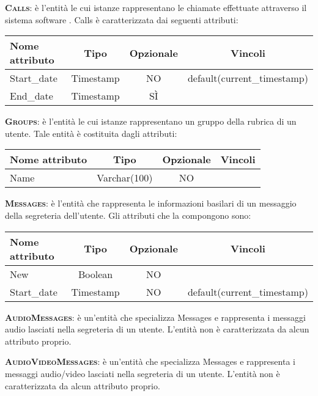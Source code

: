 \begin{description}
	\item{\scshape\bfseries Calls}: è l'entità le cui istanze rappresentano le chiamate effettuate attraverso il sistema software \caName. Calls è caratterizzata dai seguenti attributi:

\begin{center}
\begin{tabular}{lccc}
\toprule
Nome attributo & Tipo & Opzionale & Vincoli\\
\midrule
Start\_date & Timestamp & NO & default(current\_timestamp)\\
End\_date & Timestamp & SÌ & \\
\bottomrule
\end{tabular}
\end{center}

	\item{\scshape\bfseries Groups}: è l'entità le cui istanze rappresentano un gruppo della rubrica di un utente. Tale entità è costituita dagli attributi:

\begin{center}
\begin{tabular}{lccc}
\toprule
Nome attributo & Tipo & Opzionale & Vincoli\\
\midrule
Name & Varchar(100) & NO &\\
\bottomrule
\end{tabular}
\end{center}	
	
	\item{\scshape\bfseries Messages}: è l'entità che rappresenta le informazioni basilari di un messaggio della segreteria dell'utente. Gli attributi che la compongono sono:

\begin{center}
\begin{tabular}{lccc}
\toprule
Nome attributo & Tipo & Opzionale & Vincoli\\
\midrule
New & Boolean & NO & \\
Start\_date & Timestamp & NO & default(current\_timestamp) \\
\bottomrule
\end{tabular}
\end{center}	
	
	\item{\scshape\bfseries AudioMessages}: è un'entità che specializza Messages e rappresenta i messaggi audio lasciati nella segreteria di un utente. L'entità non è caratterizzata da alcun attributo proprio.
	
	\item{\scshape\bfseries AudioVideoMessages}: è un'entità che specializza Messages e rappresenta i messaggi audio/video lasciati nella segreteria di un utente.  L'entità non è caratterizzata da alcun attributo proprio.	
	
\end{description}


